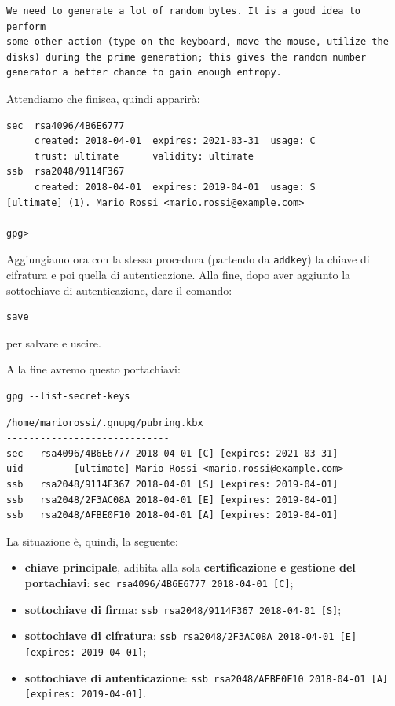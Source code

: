 \documentclass[a4paper,10pt]{article}
\begin{document}
\begin{lstlisting}
We need to generate a lot of random bytes. It is a good idea to perform
some other action (type on the keyboard, move the mouse, utilize the
disks) during the prime generation; this gives the random number
generator a better chance to gain enough entropy.
\end{lstlisting}


Attendiamo che finisca, quindi apparirà:

\begin{lstlisting}
sec  rsa4096/4B6E6777
     created: 2018-04-01  expires: 2021-03-31  usage: C
     trust: ultimate      validity: ultimate
ssb  rsa2048/9114F367
     created: 2018-04-01  expires: 2019-04-01  usage: S
[ultimate] (1). Mario Rossi <mario.rossi@example.com>

gpg>
\end{lstlisting}


Aggiungiamo ora con la stessa procedura (partendo da \texttt{addkey}) la chiave di cifratura e poi quella di autenticazione.
Alla fine, dopo aver aggiunto la sottochiave di autenticazione, dare il comando:

\begin{lstlisting}
save
\end{lstlisting}

per salvare e uscire.

Alla fine avremo questo portachiavi:

\begin{lstlisting}
gpg --list-secret-keys
\end{lstlisting}


\begin{lstlisting}
/home/mariorossi/.gnupg/pubring.kbx
-----------------------------
sec   rsa4096/4B6E6777 2018-04-01 [C] [expires: 2021-03-31]
uid         [ultimate] Mario Rossi <mario.rossi@example.com>
ssb   rsa2048/9114F367 2018-04-01 [S] [expires: 2019-04-01]
ssb   rsa2048/2F3AC08A 2018-04-01 [E] [expires: 2019-04-01]
ssb   rsa2048/AFBE0F10 2018-04-01 [A] [expires: 2019-04-01]
\end{lstlisting}

La situazione è, quindi, la seguente:

\begin{itemize}
 \item \textbf{chiave principale}, adibita alla sola \textbf{certificazione e gestione del portachiavi}: \newline \texttt{sec   rsa4096/4B6E6777 2018-04-01 [C]};
 \item \textbf{sottochiave di firma}: \newline \texttt{ssb   rsa2048/9114F367 2018-04-01 [S]};
 \item \textbf{sottochiave di cifratura}: \newline \texttt{ssb   rsa2048/2F3AC08A 2018-04-01 [E] [expires: 2019-04-01]};
 \item \textbf{sottochiave di autenticazione}: \newline \texttt{ssb   rsa2048/AFBE0F10 2018-04-01 [A] [expires: 2019-04-01]}.
\end{itemize}
\end{document}

